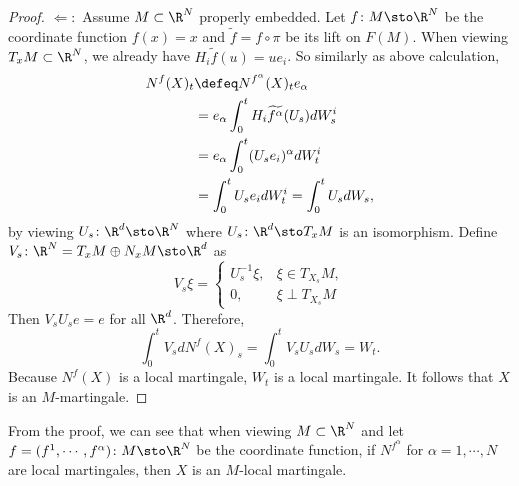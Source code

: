 \begin{proof}
    $\Leftarrow:$ Assume $M \subset \R^N$ properly embedded. Let $f \colon M \sto \R^N$ be the coordinate function $f(x) = x$ and $\widetilde{f} = f \circ \pi$ be its lift on $F(M)$. When viewing $T_xM \subset \R^N$, we already have $H_i\widetilde{f}(u) = ue_i$. So similarly as above calculation,
    \begin{align*}
        N^f(X)_t &\defeq N^{f^\alpha}(X)_te_\alpha \\
        &= e_\alpha\int_0^tH_i\widetilde{f^\alpha}(U_s) dW^i_s \\
        &= e_\alpha\int_0^t(U_se_i)^\alpha dW^i_t  \\
        &= \int_0^t U_se_i dW^i_t = \int_0^t U_sdW_s,
    \end{align*}
    by viewing $U_s \colon \R^d \sto \R^N$ where $U_s \colon \R^d \sto T_xM$ is an isomorphism. Define $V_s \colon \R^N = T_xM \oplus N_xM \sto \R^d$ as
    \begin{equation*}
        V_s \xi = \begin{cases}
            U_s^{-1} \xi,& \xi \in T_{X_s}M,\\
            0,&\xi \perp T_{X_s}M
        \end{cases}
    \end{equation*}
    Then $V_sU_se = e$ for all $\R^d$. Therefore,
    \begin{equation*}
        \int_0^t V_s dN^f(X)_s = \int_0^tV_sU_s dW_s = W_t.
    \end{equation*}
    Because $N^f(X)$ is a local martingale, $W_t$ is a local martingale. It follows that $X$ is an $M$-martingale.
\end{proof}
\begin{rmk}
    From the proof, we can see that when viewing $M \subset \R^N$ and let $f = (f^1,\cdots,f^\alpha) \colon M \sto \R^N$ be the coordinate function, if $N^{f^{\alpha}}$ for $\alpha = 1,\cdots,N$ are local martingales, then $X$ is an $M$-local martingale.
\end{rmk}


